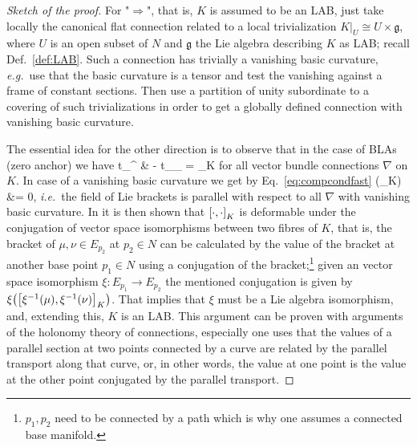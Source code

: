 \begin{proof}[Sketch of the proof]
\leavevmode\newline
For "$\Rightarrow$", that is, $K$ is assumed to be an LAB, just take locally the canonical flat connection related to a local trivialization $K|_U \cong U \times \mathfrak{g}$, where $U$ is an open subset of $N$ and $\mathfrak{g}$ the Lie algebra describing $K$ as LAB; recall Def.~\ref{def:LAB}. Such a connection has trivially a vanishing basic curvature, \textit{e.g.}~use that the basic curvature is a tensor and test the vanishing against a frame of constant sections. Then use a partition of unity subordinate to a covering of such trivializations in order to get a globally defined connection with vanishing basic curvature.

The essential idea for the other direction is to observe that in the case of BLAs (zero anchor) we have
\bas
t_{\nabla^{}}
&
- t_{\nabla_\rho}
=
\mleft[ \cdot, \cdot \mright]_K
\eas
for all vector bundle connections $\nabla$ on $K$. In case of a vanishing basic curvature we get by Eq.~\eqref{eq:compcondfast}
\bas
\nabla\mleft(\mleft[ \cdot, \cdot \mright]_K\mright)
&=
0,
\eas
\textit{i.e.}~the field of Lie brackets is parallel with respect to all $\nabla$ with vanishing basic curvature. In \cite[\S 6.4; page 236ff.]{mackenzieGeneralTheory} it is then shown that $\mleft[ \cdot, \cdot \mright]_K$ is deformable under the conjugation of vector space isomorphisms between two fibres of $K$, that is, the bracket of $\mu,\nu \in E_{p_2}$ at $p_2 \in N$ can be calculated by the value of the bracket at another base point $p_1 \in N$ using a conjugation of the bracket;\footnote{$p_1, p_2$ need to be connected by a path which is why one assumes a connected base manifold.} given an vector space isomorphism $\xi: E_{p_1} \to E_{p_2}$ the mentioned conjugation is given by $\xi\mleft( \mleft[ \xi^{-1}(\mu), \xi^{-1}(\nu) \mright]_K \mright)$. That implies that $\xi$ must be a Lie algebra isomorphism, and, extending this, $K$ is an LAB. This argument can be proven with arguments of the holonomy theory of connections, especially one uses that the values of a parallel section at two points connected by a curve are related by the parallel transport along that curve, or, in other words, the value at one point is the value at the other point conjugated by the parallel transport.


\end{proof}

